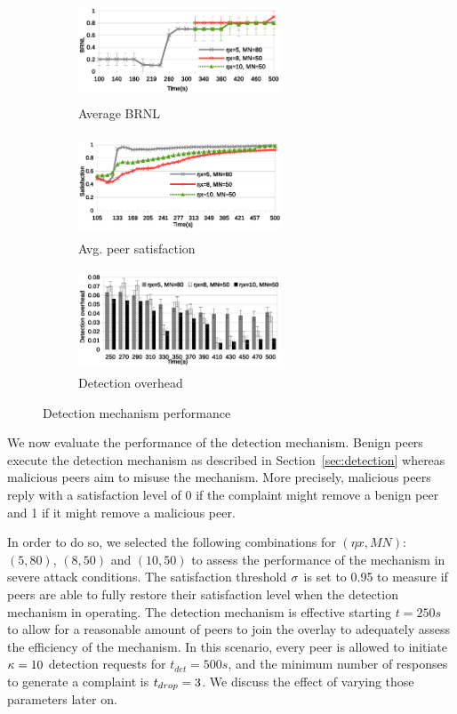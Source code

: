\begin{figure}[tb]
  \centering
  \begin{subfigure}[t]{0.32\textwidth}
    \centering
    \includegraphics[width=6cm,height=3cm]{./Figures/det-BRNL1.eps}
    \caption{Average BRNL}%
    \label{subfig:BRNL}
  \end{subfigure}
  \begin{subfigure}[t]{0.32\textwidth}
    \centering
    \includegraphics[width=6cm,height=3cm]{./Figures/det-sat.eps}
    \caption{Avg. peer satisfaction}%
    \label{subfig:det-sat}
  \end{subfigure}
  \begin{subfigure}[t]{0.32\textwidth}
    \centering
    \includegraphics[width=6cm,height=3cm]{./Figures/overhead.eps}
    \caption{Detection overhead}%
    \label{subfig:overhead}
  \end{subfigure}
  \caption{Detection mechanism performance}%
  \label{fig:detection-results}
   \vspace{-4.5mm}
\end{figure}


We now evaluate the performance of the detection mechanism.
Benign peers execute the detection mechanism as described in Section~\ref{sec:detection} whereas malicious peers aim to misuse the mechanism.
More precisely, malicious peers reply with a satisfaction level of 0 if the complaint might remove a benign peer and 1 if it might remove a malicious peer. 

In order to do so, we selected the following combinations for $(\eta x, MN)$: $(5, 80)$, $(8, 50)$ and $(10, 50)$ to assess the performance of the mechanism in severe attack conditions.
The satisfaction threshold $\sigma$ is set to 0.95 to measure if peers are able to fully restore their satisfaction level when the detection mechanism in operating.
The detection mechanism is effective starting $t=250s$ to allow for a reasonable amount of peers to join the overlay to adequately assess the efficiency of the mechanism.
In this scenario, every peer is allowed to initiate $\kappa=10$ detection requests for $t_{det}=500s$, and the minimum number of responses to generate a complaint is $t_{drop}=3$. 
We discuss the effect of varying those parameters later on.


